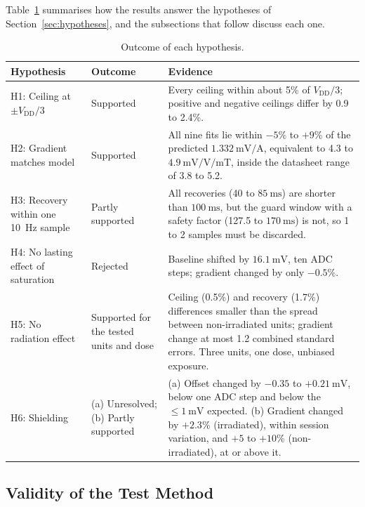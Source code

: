 \documentclass[12pt,a4paper]{article}
\begin{document}
Table~\ref{tab:hypothesis-outcomes} summarises how the results answer the hypotheses of Section~\ref{sec:hypotheses}, and the subsections that follow discuss each one.

\begin{table}[H]
\centering
\caption{Outcome of each hypothesis.}
\label{tab:hypothesis-outcomes}
\small
\begin{tabular}{@{}>{\raggedright\arraybackslash}p{}>{\raggedright\arraybackslash}p{}>{\raggedright\arraybackslash}p{}@{}}
\toprule
Hypothesis & Outcome & Evidence \\
\midrule
H1: Ceiling at $\pm V_{\text{DD}}/3$ & Supported & Every ceiling within about 5\% of $V_{\text{DD}}/3$; positive and negative ceilings differ by 0.9 to 2.4\%. \\
H2: Gradient matches model & Supported & All nine fits lie within $-5\%$ to $+9\%$ of the predicted $\SI{1.332}{\milli\volt\per\ampere}$, equivalent to 4.3 to $\SI{4.9}{\milli\volt\per\volt\per\milli\tesla}$, inside the datasheet range of 3.8 to 5.2. \\
H3: Recovery within one \SI{10}{\hertz} sample & Partly supported & All recoveries (40 to $\SI{85}{\milli\second}$) are shorter than $\SI{100}{\milli\second}$, but the guard window with a safety factor (127.5 to $\SI{170}{\milli\second}$) is not, so 1 to 2 samples must be discarded. \\
H4: No lasting effect of saturation & Rejected & Baseline shifted by $\SI{16.1}{\milli\volt}$, ten ADC steps; gradient changed by only $-0.5\%$. \\
H5: No radiation effect & Supported for the tested units and dose & Ceiling (0.5\%) and recovery (1.7\%) differences smaller than the spread between non-irradiated units; gradient change at most 1.2 combined standard errors. Three units, one dose, unbiased exposure. \\
H6: Shielding & (a) Unresolved; (b) Partly supported & (a) Offset changed by $-0.35$ to $+\SI{0.21}{\milli\volt}$, below one ADC step and below the $\le\SI{1}{\milli\volt}$ expected. (b) Gradient changed by $+2.3\%$ (irradiated), within session variation, and $+5$ to $+10\%$ (non-irradiated), at or above it. \\
\bottomrule
\end{tabular}
\end{table}

\subsection{Validity of the Test Method}
\label{sec:disc-validity}
\end{document}
